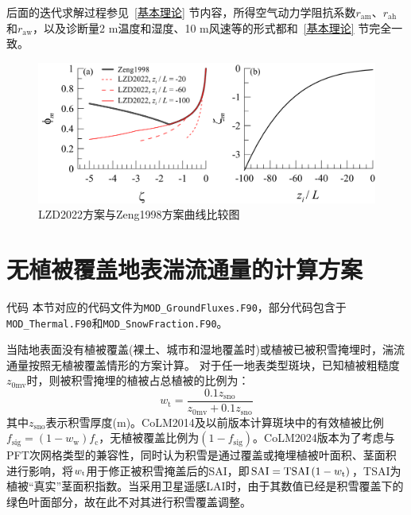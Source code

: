 后面的迭代求解过程参见~\ref{基本理论} 节内容，所得空气动力学阻抗系数$r_{\mathrm{am}}$、$r_{\mathrm{ah}}$和$r_{\mathrm{aw}}$，以及诊断量2 m温度和湿度、10 m风速等的形式都和~\ref{基本理论} 节完全一致。
{
  \begin{figure}[htbp]
    \centering
    \includegraphics[scale=0.7]{Figures/地表湍流交换过程/LZD2022方案与Zeng1998方案曲线比较图.png}
    \caption{LZD2022方案与Zeng1998方案曲线比较图}
    \label{fig:LZD2022方案与Zeng1998方案曲线比较图}
  \end{figure}
}


\section{无植被覆盖地表湍流通量的计算方案}\label{无植被覆盖地表湍流通量的计算方案}
\begin{mymdframed}{代码}
  本节对应的代码文件为\texttt{MOD\_GroundFluxes.F90}，部分代码包含于\texttt{MOD\_Thermal.F90}和\texttt{MOD\_SnowFraction.F90}。
\end{mymdframed}

当陆地表面没有植被覆盖(裸土、城市和湿地覆盖时)或植被已被积雪掩埋时，湍流通量按照无植被覆盖情形的方案计算。
对于任一地表类型斑块，已知植被粗糙度$z_{\mathrm{0mv}}$时，则被积雪掩埋的植被占总植被的比例为：
\begin{equation}
  w_{\mathrm {t}}=\frac{0.1 z_{\mathrm{sno}}}{z_{\mathrm{0mv}}+0.1 z_{\mathrm{sno}}}
\end{equation}
其中$z_{\mathrm{sno}}$表示积雪厚度(m)。CoLM2014及以前版本计算斑块中的有效植被比例$f_{\mathrm{sig}}=\left(1-w_{\mathrm {w}}\right)f_{\mathrm{c}}$，无植被覆盖比例为$\left(1-f_{\mathrm{sig}}\right)$。CoLM2024版本为了考虑与PFT次网格类型的兼容性，同时认为积雪是通过覆盖或掩埋植被叶面积、茎面积进行影响，将$w_{\rm t}$用于修正被积雪掩盖后的SAI，即${\rm SAI=TSAI}\left(1-w_{\mathrm {t}}\right)$，TSAI为植被“真实”茎面积指数。当采用卫星遥感LAI时，由于其数值已经是积雪覆盖下的绿色叶面部分，故在此不对其进行积雪覆盖调整。


